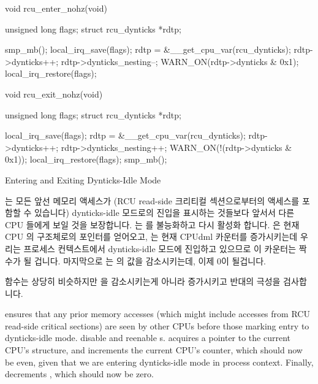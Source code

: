 \fi

\begin{listing}[tbp]
\begin{fcvlabel}
\begin{VerbatimL}[commandchars=\\\[\]]
void rcu_enter_nohz(void)
{
	unsigned long flags;
	struct rcu_dynticks *rdtp;

	smp_mb();			\lnlbl[mb]
	local_irq_save(flags);		\lnlbl[irq_sv]
	rdtp = &__get_cpu_var(rcu_dynticks); 
	rdtp->dynticks++;		
	rdtp->dynticks_nesting--;	
	WARN_ON(rdtp->dynticks & 0x1);
	local_irq_restore(flags);	\lnlbl[irq_rs]
}

void rcu_exit_nohz(void)
{
	unsigned long flags;
	struct rcu_dynticks *rdtp;

	local_irq_save(flags);
	rdtp = &__get_cpu_var(rcu_dynticks);
	rdtp->dynticks++;
	rdtp->dynticks_nesting++;
	WARN_ON(!(rdtp->dynticks & 0x1));
	local_irq_restore(flags);
	smp_mb();
}
\end{VerbatimL}
\end{fcvlabel}
\caption{Entering and Exiting Dynticks-Idle Mode}
\label{lst:formal:Entering and Exiting Dynticks-Idle Mode}
\end{listing}

\begin{fcvref}
 는 모든 앞선 메모리 액세스가 (RCU read-side 크리티컬 섹션으로부터의
액세스를 포함할 수 있습니다) dynticks-idle 모드로의 진입을 표시하는 것들보다
앞서서 다른 CPU 들에게 보일 것을 보장합니다.
 는 \IRQ 를 불능화하고 다시 활성화 합니다.
 은 현재 CPU 의  구조체로의 포인터를 얻어오고,
 는 현재 CPUdml  카운터를 증가시키는데 우리는
프로세스 컨텍스트에서 dynticks-idle 모드에 진입하고 있으므로 이 카운터는 짝수가
될 겁니다.
마지막으로  는  의 값을 감소시키는데, 이제
0이 될겁니다.
\end{fcvref}

 함수는 상당히 비슷하지만  을
감소시키는게 아니라 증가시키고 반대의  극성을 검사합니다.

\iffalse

\begin{fcvref}
 ensures that any prior memory accesses (which might
include accesses from RCU read-side critical sections) are seen
by other CPUs before those marking entry to dynticks-idle mode.
 disable and reenable \IRQ s.
 acquires a pointer to the current CPU's 
structure, and
 increments the current CPU's  counter, which
should now be even, given that we are entering dynticks-idle mode
in process context.
Finally,  decrements ,
which should now be zero.
\end{fcvref}

